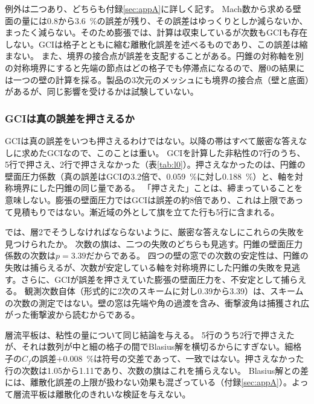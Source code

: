 \documentclass[twocolumn]{labreport}
\begin{document}
例外は二つあり、どちらも付録\ref{sec:appA}に詳しく記す。
Mach数から求める壁面の量には0.8から3.6~\%の誤差が残り、その誤差はゆっくりとしか減らないか、まったく減らない。そのため膨張では、計算は収束しているが次数もGCIも存在しない。GCIは格子とともに縮む離散化誤差を述べるものであり、この誤差は縮まない。
また、境界の接合点が誤差を支配することがある。円錐の対称軸を別の対称境界にすると先端の節点はどの格子でも停滞点になるので、層0の結果には一つの壁の計算を採る。製品の3次元のメッシュにも境界の接合点（壁と底面）があるが、同じ影響を受けるかは試験していない。

\subsubsection{GCIは真の誤差を押さえるか}
\label{sec:gcibound}

GCIは真の誤差をいつも押さえるわけではない。以降の帯はすべて厳密な答えなしに求めたGCIなので、このことは重い。
GCIを計算した非粘性の7行のうち、5行で押さえ、2行で押さえなかった（表\ref{tab:l0}）。押さえなかったのは、円錐の壁面圧力係数（真の誤差はGCIの3.2倍で、0.059~\%に対し0.188~\%）と、軸を対称境界にした円錐の同じ量である。
「押さえた」ことは、締まっていることを意味しない。膨張の壁面圧力ではGCIは誤差の約8倍であり、これは上限であって見積もりではない。漸近域の外として旗を立てた行も5行に含まれる。

では、層2でそうしなければならないように、厳密な答えなしにこれらの失敗を見つけられたか。
次数の旗は、二つの失敗のどちらも見逃す。円錐の壁面圧力係数の次数は$p=3.39$だからである。
四つの壁の窓での次数の安定性は、円錐の失敗は捕らえるが、次数が安定している軸を対称境界にした円錐の失敗を見逃す。さらに、GCIが誤差を押さえていた膨張の壁面圧力を、不安定として捕らえる。
観測次数自体（形式的に2次のスキームに対し0.39から3.39）は、スキームの次数の測定ではない。壁の窓は先端や角の過渡を含み、衝撃波角は捕獲され広がった衝撃波から読むからである。

層流平板は、粘性の量について同じ結論を与える。
5行のうち2行で押さえたが、それは数列が中と細の格子の間でBlasius解を横切るからにすぎない。細格子の$C_f$の誤差$+0.008$~\%は符号の交差であって、一致ではない。押さえなかった行の次数は1.05から1.11であり、次数の旗はこれを捕らえない。
Blasius解との差には、離散化誤差の上限が扱わない効果も混ざっている（付録\ref{sec:appA}）。よって層流平板は離散化のきれいな検証を与えない。
\end{document}
